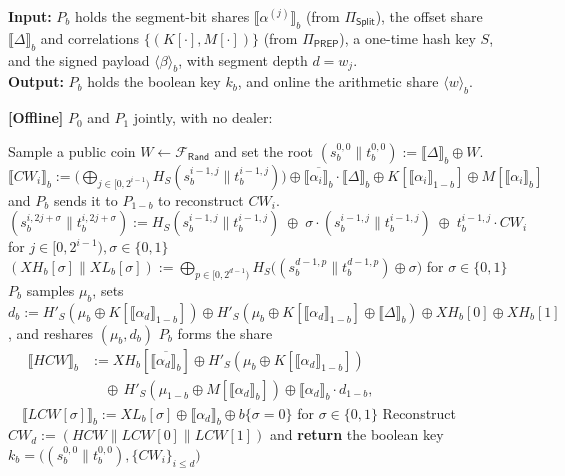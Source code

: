 \documentclass[journal]{IEEEtran}
\theoremstyle{definition}
\theoremstyle{plain}
\newcommand{\ashare}[1]{\langle #1 \rangle}             %
\newcommand{\bshare}[1]{\llbracket #1 \rrbracket}        %
\newcommand{\Frand}{\mathcal{F}_{\mathsf{Rand}}}
\newcommand{\PREP}{\Pi_{\mathsf{PREP}}}
\newcommand{\seg}[1]{^{\scriptscriptstyle(#1)}}   %
\newcommand{\wseg}{w}                              %
\begin{document}
\begin{algorithm}[t]
\caption{Per-segment key generation and evaluation ($\Pi_{\mathsf{Seg}}$)}
\label{alg:gen}
\textbf{Input:} $P_b$ holds the segment-bit shares $\bshare{\alpha\seg{j}}_b$ (from $\Pi_{\mathsf{Split}}$), the offset share $\bshare{\Delta}_b$ and correlations $\{(K[\cdot],M[\cdot])\}$ (from $\PREP$), a one-time hash key $S$, and the signed payload $\ashare{\beta}_b$, with segment depth $d=\wseg_j$. \\
\textbf{Output:} $P_b$ holds the boolean key $k_b$, and online the arithmetic share $\ashare{w}_b$.

\vspace{0.3em}
\textbf{[Offline]} $P_0$ and $P_1$ jointly, with no dealer:
\begin{algorithmic}[1]
\State Sample a public coin $W \leftarrow \Frand$ and set the root $(s^{0,0}_b\|t^{0,0}_b):=\bshare{\Delta}_b\oplus W$.
\State $\bshare{\mathit{CW}_i}_b := \big(\bigoplus_{j \in [0,2^{i-1})} H_S(s^{i-1,j}_b\|t^{i-1,j}_b)\big) \oplus \overline{\bshare{\alpha_i}_b} \!\cdot\!\bshare{\Delta}_b\oplus K[\bshare{\alpha_i}_{1-b}]\oplus M[\bshare{\alpha_i}_b]$
and $P_b$ sends it to $P_{1-b}$ to reconstruct $\mathit{CW}_i$.
\State $(s^{i,2j+\sigma}_b\|t^{i,2j+\sigma}_b) :=
H_S(s^{i-1,j}_b\|t^{i-1,j}_b)\;\oplus\;\sigma\cdot(s^{i-1,j}_b\|t^{i-1,j}_b)\;\oplus\;t^{i-1,j}_b
\cdot\mathit{CW}_i$ for $j\in[0,2^{i-1}),\sigma\in\{0,1\}$
\EndFor
\State $(XH_b[\sigma]\|XL_b[\sigma]):=\bigoplus_{p \in [0,2^{d-1})} H_S\big((s^{d-1,p}_b\|t^{d-1,p}_b)\oplus\sigma\big)$ for $\sigma\in\{0,1\}$ 
\State $P_b$ samples $\mu_b$, sets $d_b:=H'_S(\mu_b\oplus K[\bshare{\alpha_d}_{1-b}])\oplus H'_S(\mu_b\oplus K[\bshare{\alpha_d}_{1-b}]\oplus\bshare{\Delta}_b)\oplus XH_b[0]\oplus XH_b[1]$, and reshares $(\mu_b,d_b)$
\State $P_b$ forms the share
\Statex $\quad\begin{aligned}
\bshare{HCW}_b &:= XH_b[\overline{\bshare{\alpha_d}_b}]\oplus H'_S(\mu_b\oplus K[\bshare{\alpha_d}_{1-b}]) \\
&\quad \oplus\, H'_S(\mu_{1-b}\oplus M[\bshare{\alpha_d}_b])\oplus \bshare{\alpha_d}_b\cdot d_{1-b},
\end{aligned}$
\Statex $\quad \bshare{LCW[\sigma]}_b := XL_b[\sigma]\oplus\bshare{\alpha_d}_b\oplus b\{\sigma{=}0\}$ for $\sigma\in\{0,1\}$
\State Reconstruct $\mathit{CW}_d:=(HCW\|LCW[0]\|LCW[1])$ and \textbf{return} the boolean key $k_b=\big((s^{0,0}_b\|t^{0,0}_b),\{\mathit{CW}_i\}_{i\le d}\big)$
\end{algorithmic}


\end{algorithm}
\end{document}
